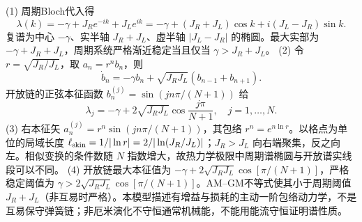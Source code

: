 (1) 周期Bloch代入得
\[
\lambda(k)=-\gamma+J_Re^{-ik}+J_Le^{ik}=-\gamma+(J_R+J_L)\cos k+i(J_L-J_R)\sin k.
\]
复谱为中心 \(-\gamma\)、实半轴 \(J_R+J_L\)、虚半轴 \(|J_L-J_R|\) 的椭圆。最大实部为 \(-\gamma+J_R+J_L\)，周期系统严格渐近稳定当且仅当 \(\gamma>J_R+J_L\)。
(2) 令 \(r=\sqrt{J_R/J_L}\)，取 \(a_n=r^n b_n\)，则
\[
\dot b_n=-\gamma b_n+\sqrt{J_RJ_L}(b_{n-1}+b_{n+1}).
\]
开放链的正弦本征函数 \(b_n^{(j)}=\sin(jn\pi/(N+1))\) 给
\[
\lambda_j=-\gamma+2\sqrt{J_RJ_L}\cos\frac{j\pi}{N+1},\quad j=1,\ldots,N.
\]
(3) 右本征矢 \(a_n^{(j)}=r^n\sin(jn\pi/(N+1))\)，其包络 \(r^n=e^{n\ln r}\)。以格点为单位的局域长度 \(\ell_{\rm skin}=1/|\ln r|=2/|\ln(J_R/J_L)|\)；\(J_R>J_L\) 向右端聚集，反之向左。相似变换的条件数随 \(N\) 指数增大，故热力学极限中周期谱椭圆与开放谱实线段可以不同。
(4) 开放链最大本征值为 \(-\gamma+2\sqrt{J_RJ_L}\cos[\pi/(N+1)]\)，严格稳定阈值为 \(\gamma>2\sqrt{J_RJ_L}\cos[\pi/(N+1)]\)。AM--GM不等式使其小于周期阈值 \(J_R+J_L\)（非互易时严格）。本模型描述有增益与损耗的主动一阶包络动力学，不是互易保守弹簧链；非厄米演化不守恒通常机械能，不能用能流守恒证明谱性质。
